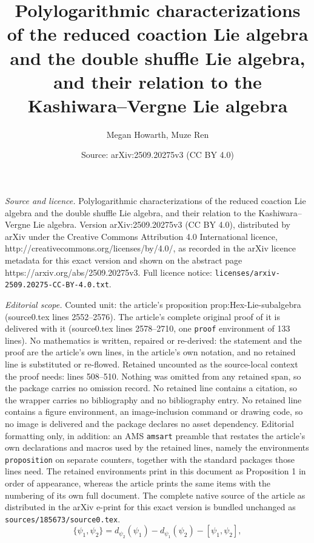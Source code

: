 \documentclass[10pt,a4paper]{amsart}
\title{Polylogarithmic characterizations of the reduced coaction Lie algebra and the double shuffle Lie algebra, and their relation to the Kashiwara--Vergne Lie algebra}
\author{Megan Howarth, Muze Ren}
\date{Source: arXiv:2509.20275v3 (CC BY 4.0)}
\begin{document}
\maketitle

\noindent\emph{Source and licence.} Polylogarithmic characterizations of the reduced coaction Lie algebra and the double shuffle Lie algebra, and their relation to the Kashiwara--Vergne Lie algebra. Version arXiv:2509.20275v3 (CC BY 4.0), distributed by arXiv under the Creative Commons Attribution 4.0 International licence, http://creativecommons.org/licenses/by/4.0/, as recorded in the arXiv licence metadata for this exact version and shown on the abstract page https://arxiv.org/abs/2509.20275v3. Full licence notice: \texttt{licenses/arxiv-2509.20275-CC-BY-4.0.txt}.\par\smallskip

\noindent\textit{Editorial scope.} Counted unit: the article's proposition prop:Hex-Lie-subalgebra (source0.tex lines 2552--2576). The article's complete original proof of it is delivered with it (source0.tex lines 2578--2710, one \texttt{proof} environment of 133 lines). No mathematics is written, repaired or re-derived: the statement and the proof are the article's own lines, in the article's own notation, and no retained line is substituted or re-flowed.  Retained uncounted as the source-local context the proof needs: lines 508--510.  Nothing was omitted from any retained span, so the package carries no omission record.  No retained line contains a citation, so the wrapper carries no bibliography and no bibliography entry.  No retained line contains a figure environment, an image-inclusion command or drawing code, so no image is delivered and the package declares no asset dependency.  Editorial formatting only, in addition: an AMS \texttt{amsart} preamble that restates the article's own declarations and macros used by the retained lines, namely the environments \texttt{proposition} on separate counters, together with the standard packages those lines need.  The retained environments print in this document as Proposition 1 in order of appearance, whereas the article prints the same items with the numbering of its own full document.  The complete native source of the article as distributed in the arXiv e-print for this exact version is bundled unchanged as \texttt{sources/185673/source0.tex}.
	\begin{equation}\label{eq:Ihara_bracket}
		\{\psi_1,\psi_2\}=d_{\psi_2}(\psi_1)-d_{\psi_1}(\psi_2)-[\psi_1,\psi_2],
	\end{equation}
\end{document}
